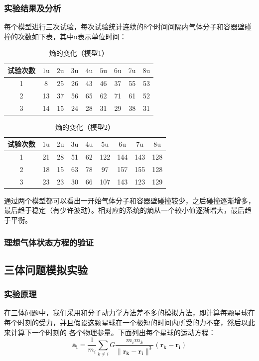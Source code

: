 ﻿\documentclass{article}
\begin{document}
	\subsubsection*{实验结果及分析}
	每个模型进行三次试验，每次试验统计连续的8个时间间隔内气体分子和容器壁碰撞的次数如下表，其中$\mathrm{u}$表示单位时间：
	\begin{table}[H]
		\centering
		\caption{\label{tab:a}熵的变化（模型1）}
		\begin{tabular}{ccccccccc}
			\toprule
			试验次数 & $1\mathrm{u}$ & $2\mathrm{u}$ & $3\mathrm{u}$ & $4\mathrm{u}$ & $5\mathrm{u}$ & $6\mathrm{u}$ & $7\mathrm{u}$ & $8\mathrm{u}$\\
			\midrule
			1 &   8  & 25 & 26 & 43 & 46 & 37 & 55 & 53 \\
			2 &   13 & 37 & 56 & 65 & 62 & 71 & 61 & 52 \\
			3 &   14 & 15 & 24 & 28 & 31 & 29 & 38 & 31 \\
			\bottomrule
		\end{tabular}
	\end{table}
	\begin{table}[H]
		\centering
		\caption{\label{tab:a}熵的变化（模型2）}
		\begin{tabular}{ccccccccc}
			\toprule
			试验次数 & $1\mathrm{u}$ & $2\mathrm{u}$ & $3\mathrm{u}$ & $4\mathrm{u}$ & $5\mathrm{u}$ & $6\mathrm{u}$ & $7\mathrm{u}$ & $8\mathrm{u}$\\
			\midrule
			1 &   21 & 28 & 51 & 62 & 122 & 144 & 143 & 128 \\
			2 &   18 & 15 & 63 & 78 & 97 & 157 & 155 & 128 \\
			3 &   23 & 23 & 30 & 66 & 107 & 143 & 123 & 129 \\
			\bottomrule
		\end{tabular}
	\end{table}
	通过两个模型都可以看出一开始气体分子和容器壁碰撞较少，之后碰撞逐渐增多，最后趋于稳定（有少许波动）。相对应的系统的熵从一个较小值逐渐增大，最后趋于平衡。
	\subsubsection{理想气体状态方程的验证}
	\subsection{三体问题模拟实验}
	\subsubsection*{实验原理}
	在三体问题中，我们采用和分子动力学方法差不多的模拟方法，即计算每颗星球在每个时刻的受力，并且假设这颗星球在一个极短的时间内所受的力不变，然后以此来计算下一个时刻的
	各个物理参量。下面列出每个星球的运动方程：
	\[\mathbf{a_i} = \frac{1}{m_i}\sum_{k \neq i} G\frac{m_im_k}{\lVert \mathbf{r_k} - \mathbf{r_i} \rVert^3}(\mathbf{r_k} - \mathbf{r_i})\]
\end{document}

